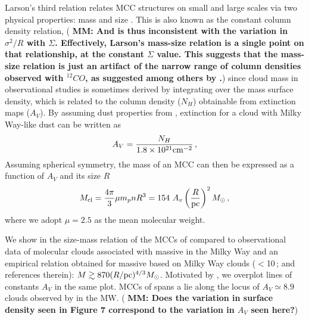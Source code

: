 \IfFileExists{emulateapjlegacy.cls}{\documentclass[iop]{emulateapjlegacy}}{\documentclass[iop]{emulateapj}}
\newcommand{\MM}[1]{({\bf \color{mmcolor} MM: #1})}
\begin{document}
Larson's third relation relates MCC structures on small and large
scales via two physical properties: mass and size \citep{Larson81a,
  McKee07a}. This is also known as the constant column density
relation,
\MM{And is thus inconsistent with the variation in $\sigma^2/R$ with
  $\Sigma$.  Effectively, Larson's mass-size relation is a single
  point on that relationship, at the constant $\Sigma$ value.  This
  suggests that the mass-size relation is just an artifact of the
  narrow range of column densities observed with $^{12}CO$, as
  suggested among others by \citet{Ballesteros11}.}
since cloud mass in observational studies is sometimes derived by integrating over the mass surface density, 
which is related to the column density ($N_H$) obtainable from extinction maps ($A_V$). 
By assuming dust properties from \citet[][]{weingartner:2001}, extinction for a cloud with Milky Way-like dust can be written as 
\begin{equation}
A_V = \frac{N_H}{1.8 \times 10^{21} {\rm cm}^{-2}}\,,
\end{equation}
Assuming spherical symmetry, the mass of an MCC can then be expressed as a function of $A_V$ and its size $R$
\begin{equation}\label{eqn:constantcolumndensity}
M_{\rm cl} = \frac{4\pi}{3} \mu m_p n R^3 = 154~A_v \left(\frac{R}{\rm pc}\right)^2 \Msun \,,
\end{equation}
where we adopt $\mu = 2.5$ as the mean molecular weight.  

We show in  the size-mass relation of the MCCs of \flower compared to observational data of molecular clouds associated with massive \SF in the 
Milky Way \citep{Beuther02a, Mueller02a, Hill05a, Motte07a} and an empirical relation obtained for massive \SF based on Milky Way clouds ($<$10\,\Msun; \citealt{Kauffmann10b, Kauffmann10c} and references therein): $M \gtrsim 870(R/{\rm pc})^{4/3} M_\odot$.
Motivated by \obs, we overplot lines of constants $A_V$ in the same plot.
MCCs of \flower spans a 
 lie along the locus of $A_V \simeq 8.9$ clouds observed by
\citet{Lombardi10a} in the MW. 
\MM{Does the variation in surface
  density seen in Figure 7 correspond to the variation in $A_V$ seen
  here?}
%
\end{document}
